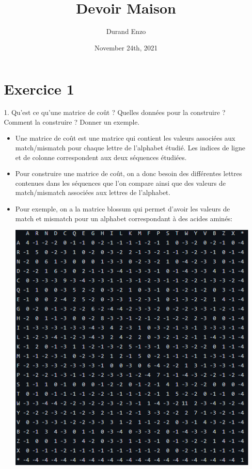\documentclass[
	12pt, %
]{fphw}
\title{Devoir Maison} %
\author{Durand Enzo} %
\date{November 24th, 2021} %
\institute{Sorbonne Université} %
\begin{document}
\maketitle %


\section*{Exercice 1}

\begin{problem}
	1. Qu'est ce qu'une matrice de coût ? Quelles données pour la construire ? Comment la construire ? Donner un exemple.
\end{problem}
\begin{center}
	\begin{itemize}
		\item Une matrice de coût est une matrice qui contient les valeurs associées aux match/mismatch pour chaque lettre de l'alphabet étudié. Les indices de ligne et de colonne correspondent aux deux séquences étudiées.
		\item Pour construire une matrice de coût, on a donc besoin des différentes lettres contenues dans les séquences que l'on compare ainsi que des valeurs de match/mismatch associées aux lettres de l'alphabet.
		\item Pour exemple, on a la matrice blossum qui permet d'avoir les valeurs de match et mismatch pour un alphabet correspondant à des acides aminés: 
			\begin{center}
				\includegraphics[width=0.5\columnwidth]{blossum.png} %
			\end{center}
	\end{itemize}
\end{center}
\end{document}
